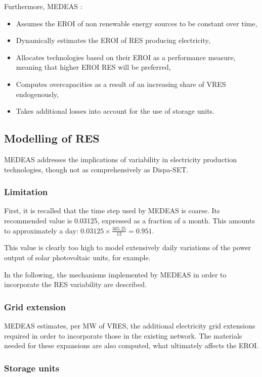 Furthermore, MEDEAS \cite{medeas-eroi}:
\begin{itemize}
    \item Assumes the EROI of non renewable energy sources to be constant over time,
    \item Dynamically estimates the EROI of RES producing electricity,
    \item Allocates technologies based on their EROI as a performance measure, meaning that higher EROI RES will be preferred,
    \item Computes overcapacities as a result of an increasing share of VRES endogenously,
    \item Takes additional losses into account for the use of storage units.
\end{itemize}

\subsection{Modelling of RES}

MEDEAS addresses the implications of variability in electricity production technologies, though not as comprehensively as Dispa-SET.

\subsubsection{Limitation}

First, it is recalled that the time step used by MEDEAS is coarse. Its recommended value is 0.03125, expressed as a fraction of a month. This amounts to approximately a day: $0.03125 \times \frac{365.25}{12} = 0.951$.

This value is clearly too high to model extensively daily variations of the power output of solar photovoltaic units, for example.

In the following, the mechanisms implemented by MEDEAS in order to incorporate the RES variability are described.

\subsubsection{Grid extension}

MEDEAS estimates, per MW of VRES, the additional electricity grid extensions required in order to incorporate those in the existing network. The materials needed for these expansions are also computed, what ultimately affects the EROI.

\subsubsection{Storage units}

